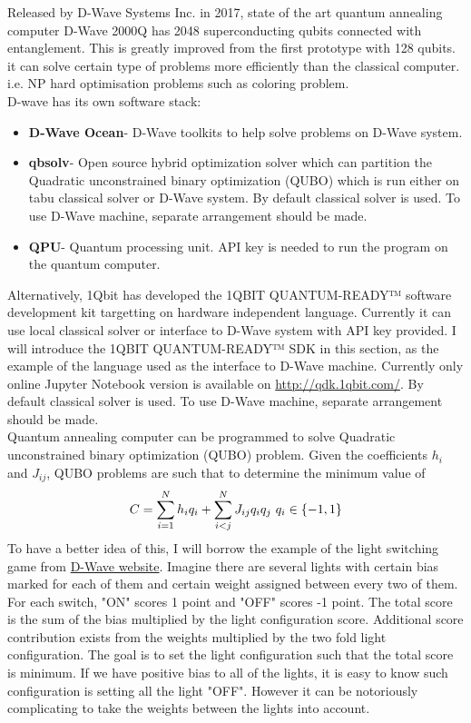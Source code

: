  Released by D-Wave Systems Inc. in 2017, state of the art quantum annealing computer D-Wave 2000Q has 2048 superconducting qubits connected with entanglement.  This is greatly improved  from the first prototype with 128 qubits. it can solve certain type of problems more efficiently than the classical computer. i.e. NP hard optimisation problems such as coloring problem.\\
  D-wave has its own software stack:
\begin{itemize}
    \item \textbf{D-Wave Ocean}- D-Wave toolkits to help solve problems on D-Wave system.
     \item \textbf{qbsolv}- Open source hybrid optimization solver which can partition the Quadratic unconstrained binary optimization (QUBO) which is run either on tabu classical solver or D-Wave system. By default classical solver is used. To use D-Wave machine, separate arrangement should be made.
    \item \textbf{QPU}- Quantum processing unit. API key is needed to run the program on the quantum computer.
 \end{itemize}
Alternatively, 1Qbit has developed the 1QBIT QUANTUM-READY™ software development kit targetting on hardware independent language. Currently it can use local classical solver or interface to D-Wave system with API key provided.
I will introduce the 1QBIT QUANTUM-READY™ SDK in this section, as the example of the language used as the interface to D-Wave machine. Currently only online Jupyter Notebook version is available on \url{http://qdk.1qbit.com/}.
By default classical solver is used. To use D-Wave machine, separate arrangement should be made.\\
Quantum annealing computer can be programmed to solve Quadratic unconstrained binary optimization (QUBO) problem. Given the coefficients $h_i$ and $J_{ij}$, QUBO problems are such that to determine the minimum value of
\begin{equation}
C=\sum_{i=1}^{N} h_iq_i+\sum_{i<j}^{N} J_{ij}q_iq_j\\\\\ q_i\in\{-1,1\}
\end{equation}
To have a better idea of this, I will borrow the example of the light switching game from \href{https://www.dwavesys.com/tutorials/background-reading-series/quantum-computing-primer}{D-Wave website}. Imagine there are several lights with  certain bias marked for each of them  and certain weight assigned between every two of them. For each switch, "ON" scores 1 point and "OFF" scores -1 point. The total score is the sum of the bias multiplied by the light configuration score. Additional score contribution exists from the weights multiplied by the two fold light configuration.  The goal is to set the light configuration such that the total score is minimum. If we have positive bias to all of the lights, it is easy to know such configuration is setting all the light "OFF". However it can be notoriously complicating to take the weights between the lights into account.\\
